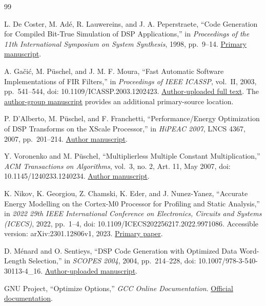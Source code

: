 \documentclass[conference]{IEEEtran}
\begin{document}
\begin{thebibliography}{99}

 L. De Coster, M. Adé, R. Lauwereins, and J. A. Peperstraete, ``Code
Generation for Compiled Bit-True Simulation of DSP Applications,'' in
\emph{Proceedings of the 11th International Symposium on System
Synthesis}, 1998, pp.~9--14.
\href{https://cecs.uci.edu/~papers/compendium94-03/papers/1998/isss98/pdffiles/1_2.pdf}{Primary
manuscript}.

 A. Gačić, M. Püschel, and J. M. F. Moura, ``Fast Automatic Software
Implementations of FIR Filters,'' in \emph{Proceedings of IEEE ICASSP},
vol.~II, 2003, pp.~541--544, doi: 10.1109/ICASSP.2003.1202423.
\href{https://www.researchgate.net/publication/2589071_Fast_Automatic_Software_Implementations_of_FIR_Filters}{Author-uploaded
full text}. The
\href{https://spiral.ece.cmu.edu/pub-spiral/pubfile/fir.pdf}{author-group
manuscript} provides an additional primary-source location.

 P. D'Alberto, M. Püschel, and F. Franchetti, ``Performance/Energy
Optimization of DSP Transforms on the XScale Processor,'' in
\emph{HiPEAC 2007}, LNCS 4367, 2007, pp.~201--214.
\href{https://users.ece.cmu.edu/~franzf/papers/hipeac07.pdf}{Author
manuscript}.

 Y. Voronenko and M. Püschel, ``Multiplierless Multiple Constant
Multiplication,'' \emph{ACM Transactions on Algorithms}, vol.~3, no. 2,
Art. 11, May 2007, doi: 10.1145/1240233.1240234.
\href{https://spiral.ece.cmu.edu/pub-spiral/pubfile/synth_28.pdf}{Author
manuscript}.

 K. Nikov, K. Georgiou, Z. Chamski, K. Eder, and J. Nunez-Yanez,
``Accurate Energy Modelling on the Cortex-M0 Processor for Profiling and
Static Analysis,'' in \emph{2022 29th IEEE International Conference on
Electronics, Circuits and Systems (ICECS)}, 2022, pp.~1--4, doi:
10.1109/ICECS202256217.2022.9971086. Accessible version:
arXiv:2301.12806v1, 2023.
\href{https://arxiv.org/html/2301.12806v1}{Primary paper}.

 D. Ménard and O. Sentieys, ``DSP Code Generation with Optimized Data
Word-Length Selection,'' in \emph{SCOPES 2004}, 2004, pp.~214--228, doi:
10.1007/978-3-540-30113-4\_16.
\href{https://www.researchgate.net/publication/220905057_DSP_Code_Generation_with_Optimized_Data_Word-Length_Selection}{Author-uploaded
manuscript}.

 GNU Project, ``Optimize Options,'' \emph{GCC Online Documentation}.
\href{https://gcc.gnu.org/onlinedocs/gcc/Optimize-Options.html}{Official
documentation}.


\end{thebibliography}
\end{document}
